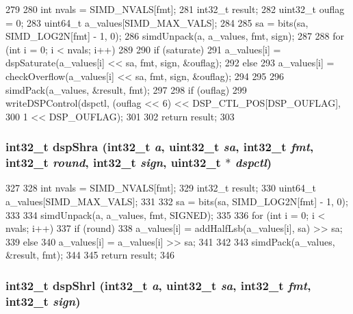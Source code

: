 \begin{DoxyCode}
279 {
280     int nvals = SIMD_NVALS[fmt];
281     int32_t result;
282     uint32_t ouflag = 0;
283     uint64_t a_values[SIMD_MAX_VALS];
284 
285     sa = bits(sa, SIMD_LOG2N[fmt] - 1, 0);
286     simdUnpack(a, a_values, fmt, sign);
287 
288     for (int i = 0; i < nvals; i++)
289     {
290         if (saturate)
291             a_values[i] = dspSaturate(a_values[i] << sa, fmt, sign, &ouflag);
292         else
293             a_values[i] = checkOverflow(a_values[i] << sa, fmt, sign, &ouflag);
294     }
295 
296     simdPack(a_values, &result, fmt);
297 
298     if (ouflag)
299         writeDSPControl(dspctl, (ouflag << 6) << DSP_CTL_POS[DSP_OUFLAG],
300                         1 << DSP_OUFLAG);
301 
302     return result;
303 }
\end{DoxyCode}
\hypertarget{namespaceMipsISA_a4664f70ef32674a9d5794fd932ce58bd}{
\subsubsection[{dspShra}]{\setlength{\rightskip}{0pt plus 5cm}int32\_\-t dspShra (int32\_\-t {\em a}, \/  {\bf uint32\_\-t} {\em sa}, \/  int32\_\-t {\em fmt}, \/  int32\_\-t {\em round}, \/  int32\_\-t {\em sign}, \/  {\bf uint32\_\-t} $\ast$ {\em dspctl})}}
\label{namespaceMipsISA_a4664f70ef32674a9d5794fd932ce58bd}



\begin{DoxyCode}
327 {
328     int nvals = SIMD_NVALS[fmt];
329     int32_t result;
330     uint64_t a_values[SIMD_MAX_VALS];
331 
332     sa = bits(sa, SIMD_LOG2N[fmt] - 1, 0);
333 
334     simdUnpack(a, a_values, fmt, SIGNED);
335 
336     for (int i = 0; i < nvals; i++) {
337         if (round)
338             a_values[i] = addHalfLsb(a_values[i], sa) >> sa;
339         else
340             a_values[i] = a_values[i] >> sa;
341     }
342 
343     simdPack(a_values, &result, fmt);
344 
345     return result;
346 }
\end{DoxyCode}
\hypertarget{namespaceMipsISA_a3a5769efff7a137e7cc0bbbfa2eb8d74}{
\subsubsection[{dspShrl}]{\setlength{\rightskip}{0pt plus 5cm}int32\_\-t dspShrl (int32\_\-t {\em a}, \/  {\bf uint32\_\-t} {\em sa}, \/  int32\_\-t {\em fmt}, \/  int32\_\-t {\em sign})}}
\label{namespaceMipsISA_a3a5769efff7a137e7cc0bbbfa2eb8d74}



